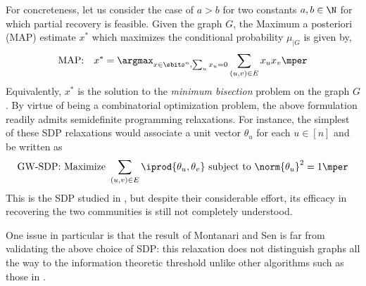 %
%
%
%
For concreteness, let us consider the case of $a > b$ for two constants $a, b \in \N$ for which partial recovery is feasible.
%
Given the graph $G$, the Maximum a posteriori (MAP) estimate $x^*$ which maximizes the conditional probability $\mu_{|G}$ is given by,
%
\begin{align*} &\text{MAP:} &  x^* = \argmax_{x \in \sbits^n, \sum_u x_u = 0} \sum_{(u,v) \in E} x_u x_v \mper \end{align*}
%
Equivalently, $x^*$ is the solution to the {\it minimum bisection} problem on the graph $G$.
%
By virtue of being a combinatorial optimization problem, the above formulation readily admits semidefinite programming relaxations.
%
For instance, the simplest of these SDP relaxations would associate a unit vector $\theta_u$ for each $u \in [n]$ and be written as
%
$$ \text{GW-SDP: Maximize } \sum_{(u,v) \in E} \iprod{\theta_u, \theta_v} \text{ subject to } \norm{\theta_u}^2 = 1 \mper$$
%
This is the SDP studied in \cite{guedon2016community,montanari2015semidefinite}, but despite their considerable effort, its efficacy in recovering the two communities is still not completely understood.
%

One issue in particular is that the result of Montanari and Sen \cite{montanari2015semidefinite} is far from validating the above choice of SDP:
%
this relaxation does not distinguish graphs all the way to the information theoretic threshold unlike other algorithms such as those in \cite{mossel2018proof,massoulie2014community}.

